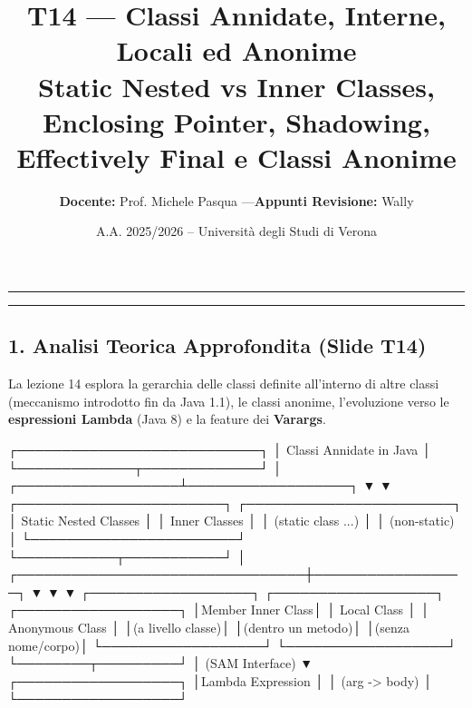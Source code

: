 \documentclass[11pt,a4paper]{article}
\title{\Huge\bfseries\sffamily\color{brandblue} T14 --- Classi Annidate, Interne, Locali ed Anonime \\[0.3em] \large\sffamily Static Nested vs Inner Classes, Enclosing Pointer, Shadowing, Effectively Final e Classi Anonime}
\author{\textbf{Docente:} Prof. Michele Pasqua \quad---\quad \textbf{Appunti Revisione:} Wally}
\date{A.A. 2025/2026 -- Universit\`a degli Studi di Verona}
\begin{document}
\maketitle
\thispagestyle{fancy}
\vspace{-1.2em}
\noindent\textcolor{brandblue}{\rule{\textwidth}{0.8pt}}
\vspace{1.2em}

\begin{center}\rule{0.5\linewidth}{0.5pt}\end{center}

\subsection{1. Analisi Teorica Approfondita (Slide
T14)}\label{analisi-teorica-approfondita-slide-t14}

La lezione 14 esplora la gerarchia delle classi definite all'interno di
altre classi (meccanismo introdotto fin da Java 1.1), le classi anonime,
l'evoluzione verso le \textbf{espressioni Lambda} (Java 8) e la feature
dei \textbf{Varargs}.

\needspace{7cm}
\begin{asciibox}
                 ┌───────────────────────────┐
                 │  Classi Annidate in Java  │
                 └─────────────┬─────────────┘
                               │
            ┌──────────────────┴──────────────────┐
            ▼                                     ▼
 ┌───────────────────────┐             ┌───────────────────────┐
 │ Static Nested Classes │             │     Inner Classes     │
 │   (static class ...)  │             │     (non-static)      │
 └───────────────────────┘             └───────────┬───────────┘
                                                   │
                  ┌────────────────────────────────┼─────────────────┐
                  ▼                                ▼                 ▼
       ┌──────────────────┐ ┌──────────────────┐ ┌──────────────────┐
       │Member Inner Class│ │   Local Class    │ │ Anonymous Class  │
       │(a livello classe)│ │(dentro un metodo)│ │(senza nome/corpo)│
       └──────────────────┘ └──────────────────┘ └────────┬─────────┘
                                                           │ (SAM Interface)
                                                           ▼
                                                 ┌──────────────────┐
                                                 │Lambda Expression │
                                                 │  (arg -> body)   │
                                                 └──────────────────┘
\end{asciibox}
\end{document}
